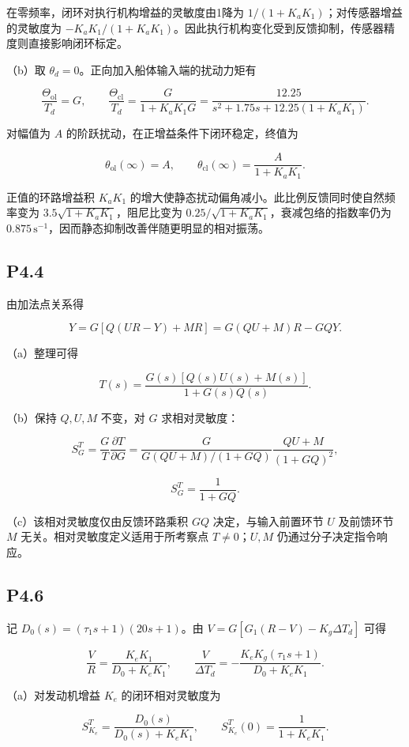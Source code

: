 \documentclass[UTF8,12pt]{ctexart}
\begin{document}
在零频率，闭环对执行机构增益的灵敏度由1降为 $1/(1+K_aK_1)$；对传感器增益的灵敏度为 $-K_aK_1/(1+K_aK_1)$。因此执行机构变化受到反馈抑制，传感器精度则直接影响闭环标定。

（b）取 $\theta_d=0$。正向加入船体输入端的扰动力矩有

\[
\frac{\Theta_{\mathrm{ol}}}{T_d}=G,\qquad \frac{\Theta_{\mathrm{cl}}}{T_d}=\frac{G}{1+K_aK_1G}=\frac{12.25}{s^2+1.75s+12.25(1+K_aK_1)}.
\]

对幅值为 $A$ 的阶跃扰动，在正增益条件下闭环稳定，终值为

\[
\boxed{\theta_{\mathrm{ol}}(\infty)=A,\qquad \theta_{\mathrm{cl}}(\infty)=\frac{A}{1+K_aK_1}}.
\]

正值的环路增益积 $K_aK_1$ 的增大使静态扰动偏角减小。此比例反馈同时使自然频率变为 $3.5\sqrt{1+K_aK_1}$，阻尼比变为 $0.25/\sqrt{1+K_aK_1}$，衰减包络的指数率仍为 $0.875\,\mathrm{s}^{-1}$，因而静态抑制改善伴随更明显的相对振荡。


\subsection*{P4.4}
由加法点关系得

\[
Y=G[Q(UR-Y)+MR]=G(QU+M)R-GQY.
\]

（a）整理可得

\[
\boxed{T(s)=\frac{G(s)[Q(s)U(s)+M(s)]}{1+G(s)Q(s)}}.
\]

（b）保持 $Q,U,M$ 不变，对 $G$ 求相对灵敏度：

\[
S_G^T=\frac GT\frac{\partial T}{\partial G}=\frac{G}{G(QU+M)/(1+GQ)}\frac{QU+M}{(1+GQ)^2},
\]

\[
\boxed{S_G^T=\frac1{1+GQ}}.
\]

（c）该相对灵敏度仅由反馈环路乘积 $GQ$ 决定，与输入前置环节 $U$ 及前馈环节 $M$ 无关。相对灵敏度定义适用于所考察点 $T\ne0$；$U,M$ 仍通过分子决定指令响应。


\subsection*{P4.6}
记 $D_0(s)=(\tau_1s+1)(20s+1)$。由 $V=G[G_1(R-V)-K_g\Delta T_d]$ 可得

\[
\frac VR=\frac{K_eK_1}{D_0+K_eK_1},\qquad \frac{V}{\Delta T_d}=-\frac{K_eK_g(\tau_1s+1)}{D_0+K_eK_1}.
\]

（a）对发动机增益 $K_e$ 的闭环相对灵敏度为

\[
\boxed{S_{K_e}^T=\frac{D_0(s)}{D_0(s)+K_eK_1}},\qquad S_{K_e}^T(0)=\frac1{1+K_eK_1}.
\]
\end{document}
